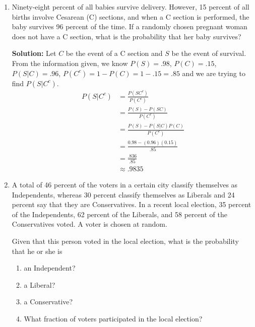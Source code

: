 \documentclass{report}
\begin{document}
\begin{enumerate}
\item Ninety-eight percent of all babies survive delivery.
However, 15 percent of all births involve Cesarean
(C) sections, and when a C section is performed,
the baby survives 96 percent of the time. If a randomly
chosen pregnant woman does not have a
C section, what is the probability that her baby
survives?

{\bf Solution:} Let $C$ be the event of a C section and $S$ be the event of survival. From the information given, we know $P(S) = .98$, $P(C)=.15$, $P(S\vert C)=.96$, $P(C^c)=1-P(C)=1-.15=.85$ and we are trying to find  $P(S \vert C^c)$.
\begin{align*}
P(S\vert C^c) &= \frac{P(SC^c)}{P(C^c)} \\
&= \frac{P(S)-P(SC)}{P(C^c)} \\
&= \frac{P(S) - P(S\vert C)P(C)}{P(C^c)} \\
&=\frac{0.98-(0.96)(0.15)}{.85} \\
&=\frac{.836}{.85} \\
&\approx .9835
\end{align*}

\item A total of 46 percent of the voters in a certain city
classify themselves as Independents, whereas 30
percent classify themselves as Liberals and 24 percent
say that they are Conservatives. In a recent
local election, 35 percent of the Independents, 62
percent of the Liberals, and 58 percent of the Conservatives
voted. A voter is chosen at random.

Given that this person voted in the local election,
what is the probability that he or she is
\begin{enumerate}
\item an Independent?
\item a Liberal?
\item a Conservative?
\item What fraction of voters participated in the
local election?
\end{enumerate}


\end{enumerate}
\end{document}

